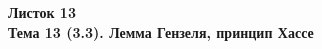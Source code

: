 \documentclass[a4paper, 11pt]{article}
\begin{document}
\begin{center} \Large \bf Листок 13\\ Тема 13 (3.3). Лемма Гензеля, принцип Хассе \end{center}


\end{document}
